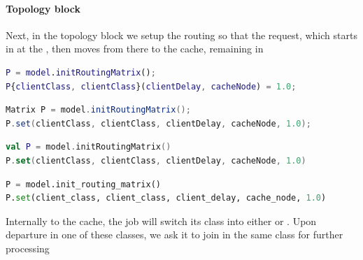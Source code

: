 \paragraph{Topology block}
Next, in the topology block we setup the routing so that the request, which starts in  at the , then moves from there to the cache, remaining in 
\begin{MATLAB}
\begin{lstlisting}[language = matlab]
% Block 3: topology
P = model.initRoutingMatrix();
P{clientClass, clientClass}(clientDelay, cacheNode) = 1.0;
\end{lstlisting}
\end{MATLAB}
\begin{JAVA}
\begin{lstlisting}[language = java, basicstyle=\ttfamily\scriptsize]
Matrix P = model.initRoutingMatrix();
P.set(clientClass, clientClass, clientDelay, cacheNode, 1.0);
\end{lstlisting}
\end{JAVA}
\begin{KOTLIN}
\begin{lstlisting}[language = kotlin, basicstyle=\ttfamily\scriptsize]
val P = model.initRoutingMatrix()
P.set(clientClass, clientClass, clientDelay, cacheNode, 1.0)
\end{lstlisting}
\end{KOTLIN}
\begin{PYTHON}
\begin{lstlisting}[language = python]
P = model.init_routing_matrix()
P.set(client_class, client_class, client_delay, cache_node, 1.0)
\end{lstlisting}
\end{PYTHON}
Internally to the cache, the job will switch its class into either  or . Upon departure in one of these classes, we ask it to join in the same class  for further processing
